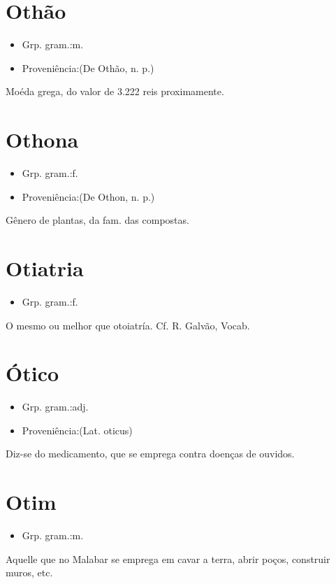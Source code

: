 \section{Othão}
\begin{itemize}
\item {Grp. gram.:m.}
\end{itemize}
\begin{itemize}
\item {Proveniência:(De \textunderscore Othão\textunderscore , n. p.)}
\end{itemize}
Moéda grega, do valor de 3.222 reis proximamente.
\section{Othona}
\begin{itemize}
\item {Grp. gram.:f.}
\end{itemize}
\begin{itemize}
\item {Proveniência:(De \textunderscore Othon\textunderscore , n. p.)}
\end{itemize}
Gênero de plantas, da fam. das compostas.
\section{Otiatria}
\begin{itemize}
\item {Grp. gram.:f.}
\end{itemize}
O mesmo ou melhor que \textunderscore otoiatría\textunderscore . Cf. R. Galvão, \textunderscore Vocab.\textunderscore 
\section{Ótico}
\begin{itemize}
\item {Grp. gram.:adj.}
\end{itemize}
\begin{itemize}
\item {Proveniência:(Lat. \textunderscore oticus\textunderscore )}
\end{itemize}
Diz-se do medicamento, que se emprega contra doenças de ouvidos.
\section{Otim}
\begin{itemize}
\item {Grp. gram.:m.}
\end{itemize}
Aquelle que no Malabar se emprega em cavar a terra, abrir poços, construir muros, etc.

